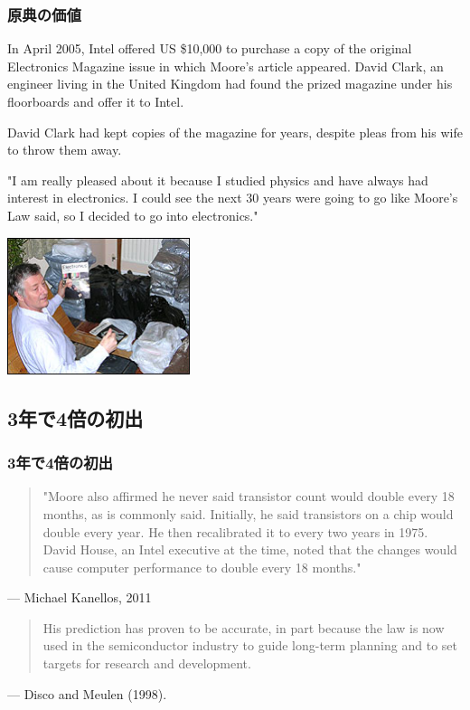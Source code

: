 \documentclass{beamer}  %
\theoremstyle{example}
\begin{document}
\begin{frame}\frametitle{原典の価値}
\small

In April 2005, Intel offered US \$10,000 to purchase a copy of the original Electronics Magazine issue in which Moore's article appeared.  David Clark, an engineer living in the United Kingdom
 had found the prized magazine under his floorboards
 and offer it to Intel.

\pause
David Clark had kept copies of the magazine for years, despite pleas from his wife to throw them away.

\pause
"I am really pleased about it because I studied physics and have always had interest in electronics. I could see the next 30 years were going to go like Moore's Law said, so I decided to go into electronics."

\begin{center}
\includegraphics[height=4cm]{moores_magfound.jpg}
\end{center}

\end{frame}



\subsection{3年で4倍の初出}
\begin{frame}\frametitle{3年で4倍の初出}
\begin{quote}
 "Moore also affirmed he never said transistor count would double every 18 months, as is commonly said. Initially, he said transistors on a chip would double every year. He then recalibrated it to every two years in 1975. David House, an Intel executive at the time, noted that the changes would cause computer performance to double every 18 months."
\end{quote}
\begin{flushright}
--- Michael Kanellos, 2011 
\end{flushright}
\end{frame}


\begin{frame}
\begin{quote}
His prediction has proven to be accurate, in part because the law is now used in the semiconductor industry to guide long-term planning and to set targets for research and development.
\end{quote}

\begin{flushright}
--- Disco and Meulen (1998).
\end{flushright}
\end{frame}
\end{document}

